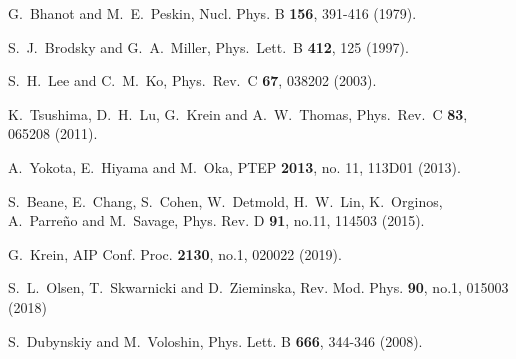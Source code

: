 \documentclass[prd,amsmath,%
twocolumn,floatfix,amssymb, preprintnumbers, linenumbers,nofootinbib, superscriptaddress]{revtex4}
\begin{document}
\begin{thebibliography}{99}
G.~Bhanot and M.~E.~Peskin,
Nucl. Phys. B \textbf{156}, 391-416 (1979).



  S.~J.~Brodsky and G.~A.~Miller,
  Phys.\ Lett.\ B {\bf 412}, 125 (1997).

  
  S.~H.~Lee and C.~M.~Ko,
  Phys.\ Rev.\ C {\bf 67}, 038202 (2003). 
  
  K.~Tsushima, D.~H.~Lu, G.~Krein and A.~W.~Thomas,
  Phys.\ Rev.\ C {\bf 83}, 065208 (2011). 

  
  A.~Yokota, E.~Hiyama and M.~Oka,
  PTEP {\bf 2013}, no. 11, 113D01 (2013).

S.~Beane, E.~Chang, S.~Cohen, W.~Detmold, H.~W.~Lin, K.~Orginos, A.~Parreño and M.~Savage,
Phys. Rev. D \textbf{91}, no.11, 114503 (2015).


G.~Krein,
AIP Conf. Proc. \textbf{2130}, no.1, 020022 (2019).

S.~L.~Olsen, T.~Skwarnicki and D.~Zieminska,
Rev. Mod. Phys. \textbf{90}, no.1, 015003 (2018)


S.~Dubynskiy and M.~Voloshin,
Phys. Lett. B \textbf{666}, 344-346 (2008). 



\end{thebibliography}
\end{document}
